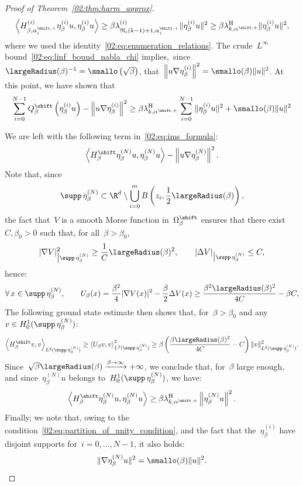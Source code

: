 \begin{proof}[Proof of Theorem~\ref{02:thm:harm_approx}]
\begin{equation}
            \left\langle H_{\beta,\alpha^{\shift,+}_{i}}^{(i)}\eta_\beta^{(i)}u,\eta_\beta^{(i)}u\right\rangle \geq \beta\lambda_{\mathfrak N_i(k-1)+1,\alpha^{\shift,+}_{i}}^{(i)}\|\eta_\beta^{(i)}u\|^2\geq \beta \lambda_{k,\alpha^{\shift,+}}^{\mathrm H}\|\eta_\beta^{(i)}u\|^2,
        \end{equation}
        where we used the identity~\eqref{02:eq:enumeration_relations}.
        The crude~$L^\infty$ bound~\eqref{02:eq:linf_bound_nabla_chi} implies,~since~$\largeRadius(\beta)^{-1} = \smallo\left(\sqrt\beta\right)$, that~$\left\|u\nabla\eta_\beta^{(i)}\right\|^2 = \smallo(\beta)\|u\|^2$.
        At this point, we have shown that 
        \[\sum_{i=0}^{N-1} Q^\shift_\beta\left(\eta_\beta^{(i)}u\right) - \left\|u\nabla \eta_\beta^{(i)}\right\|^2\geq \beta\lambda_{k,\alpha^{\shift,+}}^{\mathrm{H}}\sum_{i=0}^{N-1}\|\eta_\beta^{(i)}u\|^2 +\smallo(\beta)\|u\|^2\]

        We are left with the following term in~\eqref{02:eq:ims_formula}:
        \[\left\langle H_\beta^\shift \eta_\beta^{(N)}u,\eta_\beta^{(N)}u\right\rangle - \left\|u\nabla \eta_\beta^{(N)}\right\|^2.\]
        Note that, since
       ~$$ \supp\,\eta_\beta^{(N)} \subset \R^d\setminus \bigcup_{i=0}^m B\left(z_i,\frac12\largeRadius(\beta)\right),$$
        the fact that~$V$ is a smooth Morse function in~$ \Omega_\beta^\shift$ ensures that there exist~$C,\beta_0>0$ such that, for all~$\beta>\beta_0$,
        \[|\nabla V|^2_{\big|\supp\,\eta_\beta^{(N)}} \geq \frac1C\largeRadius(\beta)^2,\qquad |\Delta V|_{\big|\supp\,\eta_\beta^{(N)}} \leq C,\]
        hence:
        \[\forall\,x\in\supp\,\eta_\beta^{(N)},\qquad U_\beta(x)=\frac{\beta^2}4|\nabla V(x)|^2 -\frac\beta 2 \Delta V(x) \geq  \frac{\beta^2 \largeRadius(\beta)^2}{4C}-\beta C,\]
        The following ground state estimate then shows that, for~$\beta>\beta_0$ and any $v\in H_0^1(\supp\,\eta_\beta^{(N)})$:
        \[\left\langle H_\beta^\shift v,v\right\rangle_{L^2(\supp\,\eta_\beta^{(N)})} \geq \left\langle U_\beta v,v\right\rangle_{L^2(\supp\,\eta_\beta^{(N)})}^2 \geq \beta\left(\frac{\beta\largeRadius(\beta)^2}{4C}-C\right)\|v\|_{L^2(\supp\,\eta_\beta^{(N)})}^2.\]
        Since~$\sqrt\beta\largeRadius(\beta)\xrightarrow{\beta\to\infty}+\infty$, we conclude that, for~$\beta$ large enough, and since~$\eta_\beta^{(N)}u$ belongs to~$H_0^1(\supp\,\eta_\beta^{(N)})$, we have:
        \[\left\langle H_\beta^\shift \eta_\beta^{(N)}u,\eta_\beta^{(N)}u\right\rangle \geq \beta\lambda_{k,\alpha^{\shift,+}}^{\mathrm{H}}\left\|\eta_\beta^{(N)}u\right\|^2.\]
        Finally, we note that, owing to the condition~\eqref{02:eq:partition_of_unity_condition}, and the fact that the~$\eta_\beta^{(i)}$ have disjoint supports for~$i=0,\dots,N-1$, it also holds:
       ~$$\|\nabla \eta_\beta^{(N)}u\|^2 = \smallo(\beta)\|u\|^2.$$


\end{proof}
